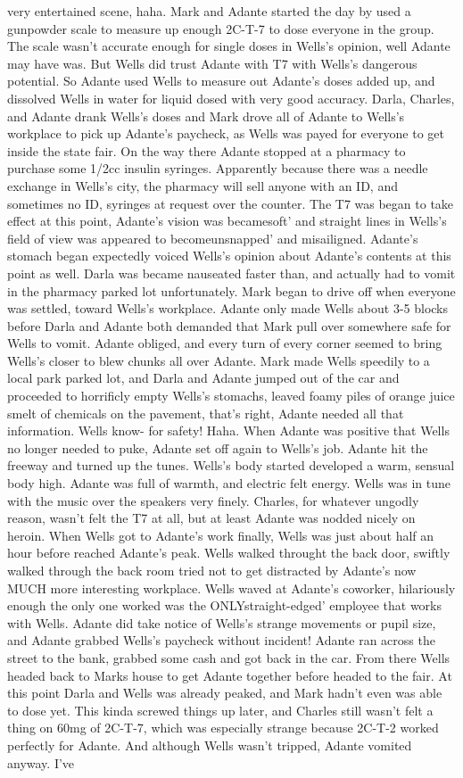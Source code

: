 \documentclass[12pt]{book}
\begin{document}
very entertained scene, haha. Mark and Adante started the day by used a gunpowder scale to measure up enough 2C-T-7 to dose everyone in the group. The scale wasn't accurate enough for single doses in Wells's opinion, well Adante may have was. But Wells did trust Adante with T7 with Wells's dangerous potential. So Adante used Wells to measure out Adante's doses added up, and dissolved Wells in water for liquid dosed with very good accuracy. Darla, Charles, and Adante drank Wells's doses and Mark drove all of Adante to Wells's workplace to pick up Adante's paycheck, as Wells was payed for everyone to get inside the state fair. On the way there Adante stopped at a pharmacy to purchase some 1/2cc insulin syringes. Apparently because there was a needle exchange in Wells's city, the pharmacy will sell anyone with an ID, and sometimes no ID, syringes at request over the counter. The T7 was began to take effect at this point, Adante's vision was becamesoft' and straight lines in Wells's field of view was appeared to becomeunsnapped' and misailigned. Adante's stomach began expectedly voiced Wells's opinion about Adante's contents at this point as well. Darla was became nauseated faster than, and actually had to vomit in the pharmacy parked lot unfortunately. Mark began to drive off when everyone was settled, toward Wells's workplace. Adante only made Wells about 3-5 blocks before Darla and Adante both demanded that Mark pull over somewhere safe for Wells to vomit. Adante obliged, and every turn of every corner seemed to bring Wells's closer to blew chunks all over Adante. Mark made Wells speedily to a local park parked lot, and Darla and Adante jumped out of the car and proceeded to horrificly empty Wells's stomachs, leaved foamy piles of orange juice smelt of chemicals on the pavement, that's right, Adante needed all that information. Wells know- for safety! Haha. When Adante was positive that Wells no longer needed to puke, Adante set off again to Wells's job. Adante hit the freeway and turned up the tunes. Wells's body started developed a warm, sensual body high. Adante was full of warmth, and electric felt energy. Wells was in tune with the music over the speakers very finely. Charles, for whatever ungodly reason, wasn't felt the T7 at all, but at least Adante was nodded nicely on heroin. When Wells got to Adante's work finally, Wells was just about half an hour before reached Adante's peak. Wells walked throught the back door, swiftly walked through the back room tried not to get distracted by Adante's now MUCH more interesting workplace. Wells waved at Adante's coworker, hilariously enough the only one worked was the ONLYstraight-edged' employee that works with Wells. Adante did take notice of Wells's strange movements or pupil size, and Adante grabbed Wells's paycheck without incident! Adante ran across the street to the bank, grabbed some cash and got back in the car. From there Wells headed back to Marks house to get Adante together before headed to the fair. At this point Darla and Wells was already peaked, and Mark hadn't even was able to dose yet. This kinda screwed things up later, and Charles still wasn't felt a thing on 60mg of 2C-T-7, which was especially strange because 2C-T-2 worked perfectly for Adante. And although Wells wasn't tripped, Adante vomited anyway. I've 
\end{document}
